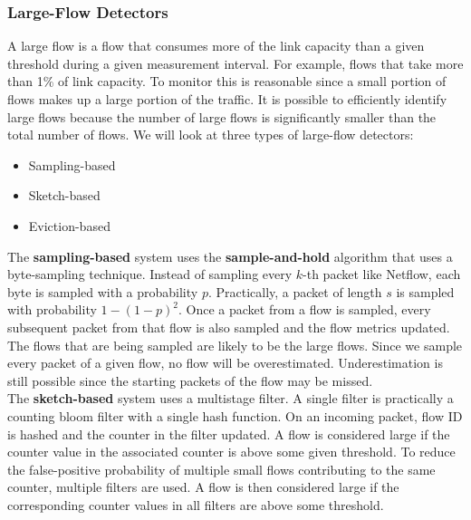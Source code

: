 \subsubsection{Large-Flow Detectors}
A large flow is a flow that consumes more of the link capacity than a given threshold during a given measurement interval. For example, flows that take more than 1\% of link capacity. To monitor this is reasonable since a small portion of flows makes up a large portion of the traffic. It is possible to efficiently identify large flows because the number of large flows is significantly smaller than the total number of flows. We will look at three types of large-flow detectors:
\begin{itemize}
\item Sampling-based
\item Sketch-based
\item Eviction-based
\end{itemize}

The \textbf{sampling-based} system uses the \textbf{sample-and-hold} algorithm that uses a byte-sampling technique. Instead of sampling every $k$-th packet like Netflow, each byte is sampled with a probability $p$. Practically, a packet of length $s$ is sampled with probability $1-(1-p)^2$. Once a packet from a flow is sampled, every subsequent packet from that flow is also sampled and the flow metrics updated. The flows that are being sampled are likely to be the large flows. Since we sample every packet of a given flow, no flow will be overestimated. Underestimation is still possible since the starting packets of the flow may be missed.\vspace{.3cm}\\

The \textbf{sketch-based} system uses a multistage filter. A single filter is practically a counting bloom filter with a single hash function. On an incoming packet, flow ID is hashed and the counter in the filter updated. A flow is considered large if the counter value in the associated counter is above some given threshold. To reduce the false-positive probability of multiple small flows contributing to the same counter, multiple filters are used. A flow is then considered large if the corresponding counter values in all filters are above some threshold.\vspace{.3cm}\\


